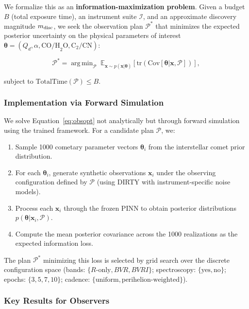 \documentclass[usenatbib]{mnras}
\DeclareMathOperator*{\argmin}{arg\,min}
\begin{document}
We formalize this as an \textbf{information-maximization problem}. Given a budget $B$ (total exposure time), an instrument suite $\mathcal{I}$, and an approximate discovery magnitude $m_{\rm disc}$, we seek the observation plan $\mathcal{P}^*$ that minimizes the expected posterior uncertainty on the physical parameters of interest $\boldsymbol{\theta} = (Q_d, \alpha, \text{CO/H}_2\text{O}, \text{C}_2/\text{CN})$:

\begin{equation}\label{eq:obsopt}
\mathcal{P}^* = \argmin_{\mathcal{P}} \; \mathbb{E}_{\mathbf{x} \sim p(\mathbf{x}|\boldsymbol{\theta})}\left[\text{tr}\left(\text{Cov}[\boldsymbol{\theta} | \mathbf{x}, \mathcal{P}]\right)\right],
\end{equation}

subject to $\text{TotalTime}(\mathcal{P}) \leq B$.

\subsubsection{Implementation via Forward Simulation}

We solve Equation~\ref{eq:obsopt} not analytically but through forward simulation using the trained framework. For a candidate plan $\mathcal{P}$, we:

\begin{enumerate}
    \item Sample 1000 cometary parameter vectors $\boldsymbol{\theta}_i$ from the interstellar comet prior distribution.
    \item For each $\boldsymbol{\theta}_i$, generate synthetic observations $\mathbf{x}_i$ under the observing configuration defined by $\mathcal{P}$ (using DIRTY with instrument-specific noise models).
    \item Process each $\mathbf{x}_i$ through the frozen PINN to obtain posterior distributions $p(\boldsymbol{\theta} | \mathbf{x}_i, \mathcal{P})$.
    \item Compute the mean posterior covariance across the 1000 realizations as the expected information loss.
\end{enumerate}

The plan $\mathcal{P}^*$ minimizing this loss is selected by grid search over the discrete configuration space (bands: $\{R\text{-only}, BVR, BVRI\}$; spectroscopy: $\{\text{yes}, \text{no}\}$; epochs: $\{3, 5, 7, 10\}$; cadence: $\{\text{uniform}, \text{perihelion-weighted}\}$).

\subsubsection{Key Results for Observers}
\end{document}

